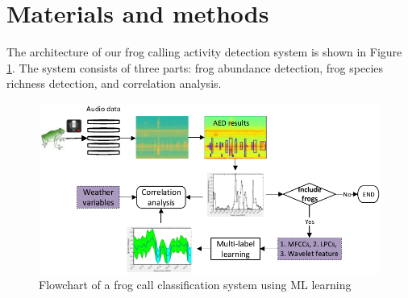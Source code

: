 

\section{Materials and methods}
The architecture of our frog calling activity detection system is shown in Figure \ref{fig:Ch7_flowchart}. The system consists of three parts: frog abundance detection, frog species richness detection, and correlation analysis.

\begin{figure}[htb!]
\centering
\includegraphics[width=\textwidth]{image/Ch7/flowchart.pdf}
\caption{Flowchart of a frog call classification system using ML learning}
\label{fig:Ch7_flowchart}
\end{figure}


